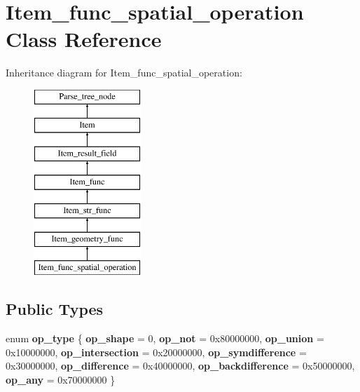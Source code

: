 \hypertarget{classItem__func__spatial__operation}{}\section{Item\+\_\+func\+\_\+spatial\+\_\+operation Class Reference}
\label{classItem__func__spatial__operation}
Inheritance diagram for Item\+\_\+func\+\_\+spatial\+\_\+operation\+:\begin{figure}[H]
\begin{center}
\leavevmode
\includegraphics[height=7.000000cm]{classItem__func__spatial__operation}
\end{center}
\end{figure}
\subsection*{Public Types}
\begin{DoxyCompactItemize}
\item 
\mbox{\label{classItem__func__spatial__operation_a6a1a3a67118090846caa6a5c7b830185}} 
enum {\bfseries op\+\_\+type} \{ \newline
{\bfseries op\+\_\+shape} = 0, 
{\bfseries op\+\_\+not} = 0x80000000, 
{\bfseries op\+\_\+union} = 0x10000000, 
{\bfseries op\+\_\+intersection} = 0x20000000, 
\newline
{\bfseries op\+\_\+symdifference} = 0x30000000, 
{\bfseries op\+\_\+difference} = 0x40000000, 
{\bfseries op\+\_\+backdifference} = 0x50000000, 
{\bfseries op\+\_\+any} = 0x70000000
 \}
\end{DoxyCompactItemize}
